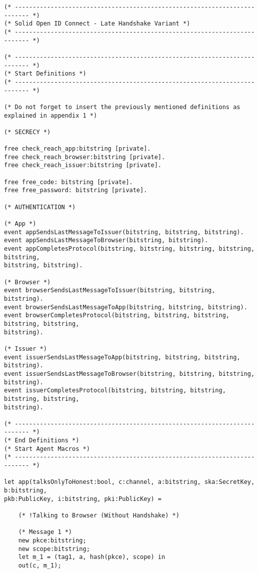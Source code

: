 \begin{Verbatim}[fontsize=\small]
(* -------------------------------------------------------------------------- *)
(* Solid Open ID Connect - Late Handshake Variant *)
(* -------------------------------------------------------------------------- *)

(* -------------------------------------------------------------------------- *)
(* Start Definitions *)
(* -------------------------------------------------------------------------- *)

(* Do not forget to insert the previously mentioned definitions as explained in appendix 1 *)

(* SECRECY *)

free check_reach_app:bitstring [private].
free check_reach_browser:bitstring [private].
free check_reach_issuer:bitstring [private].

free free_code: bitstring [private].
free free_password: bitstring [private].

(* AUTHENTICATION *)

(* App *)
event appSendsLastMessageToIssuer(bitstring, bitstring, bitstring).
event appSendsLastMessageToBrowser(bitstring, bitstring).
event appCompletesProtocol(bitstring, bitstring, bitstring, bitstring, bitstring, 
bitstring, bitstring).

(* Browser *)
event browserSendsLastMessageToIssuer(bitstring, bitstring, bitstring).
event browserSendsLastMessageToApp(bitstring, bitstring, bitstring).
event browserCompletesProtocol(bitstring, bitstring, bitstring, bitstring, bitstring, 
bitstring).

(* Issuer *)
event issuerSendsLastMessageToApp(bitstring, bitstring, bitstring, bitstring).
event issuerSendsLastMessageToBrowser(bitstring, bitstring, bitstring, bitstring).
event issuerCompletesProtocol(bitstring, bitstring, bitstring, bitstring, bitstring, 
bitstring).

(* -------------------------------------------------------------------------- *)
(* End Definitions *)
(* Start Agent Macros *)
(* -------------------------------------------------------------------------- *)

let app(talksOnlyToHonest:bool, c:channel, a:bitstring, ska:SecretKey, b:bitstring, 
pkb:PublicKey, i:bitstring, pki:PublicKey) =

    (* !Talking to Browser (Without Handshake) *)

    (* Message 1 *)
    new pkce:bitstring;
    new scope:bitstring;
    let m_1 = (tag1, a, hash(pkce), scope) in
    out(c, m_1);


\end{Verbatim}
